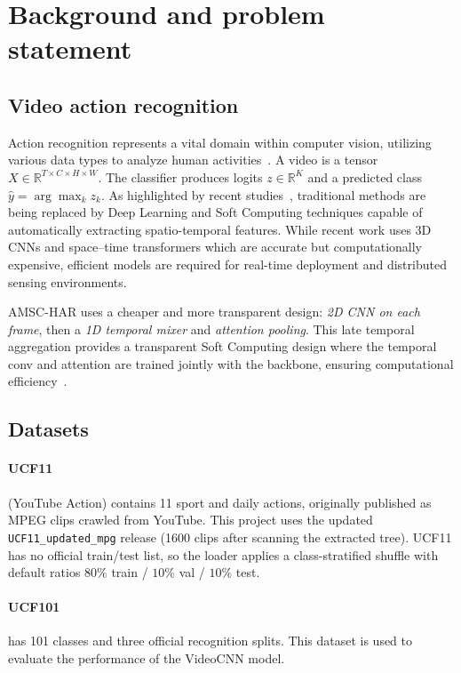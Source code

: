 \documentclass[11pt,a4paper]{article}
\begin{document}
\section{Background and problem statement}
\label{sec:bg}

\subsection{Video action recognition}

Action recognition represents a vital domain within computer vision, utilizing various data types to analyze human activities~\cite{houssein2025integrating}. A video is a tensor $X\in\mathbb{R}^{T\times C\times H\times W}$. The classifier produces logits $z\in\mathbb{R}^{K}$ and a predicted class $\hat{y}=\arg\max_k z_k$. As highlighted by recent studies~\cite{houssein2025integrating}, traditional methods are being replaced by Deep Learning and Soft Computing techniques capable of automatically extracting spatio-temporal features. While recent work uses 3D CNNs and space--time transformers which are accurate but computationally expensive, efficient models are required for real-time deployment and distributed sensing environments.

AMSC-HAR uses a cheaper and more transparent design:
\emph{2D CNN on each frame}, then a \emph{1D temporal mixer} and
\emph{attention pooling}.
This late temporal aggregation provides a transparent Soft Computing design where the temporal conv and attention are trained jointly with the backbone, ensuring computational efficiency~\cite{houssein2025integrating}.

\subsection{Datasets}

\paragraph{UCF11} (YouTube Action) contains 11 sport and
daily actions, originally published as MPEG clips crawled from YouTube.
This project uses the updated \texttt{UCF11\_updated\_mpg} release
(1600 clips after scanning the extracted tree).
UCF11 has no official train/test list, so the loader applies a
class-stratified shuffle with default ratios
$80\%$ train / $10\%$ val / $10\%$ test.

\paragraph{UCF101} has 101 classes and three official
recognition splits.
This dataset is used to evaluate the performance of the VideoCNN model.
\end{document}
